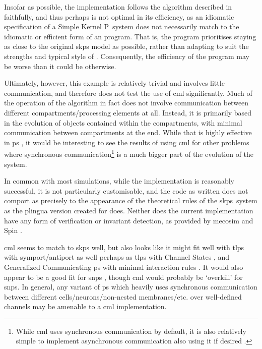 Insofar as possible, the implementation follows the algorithm described in \cite{Gheorghe2013} faithfully, and thus perhaps is not optimal in its efficiency, as an idiomatic specification of a Simple Kernel P~system does not necessarily match to the idiomatic or efficient form of an \fsharp{} program.  That is, the program prioritises staying as close to the original \gls{skps} model as possible, rather than adapting to suit the strengths and typical style of \fsharp{}.  Consequently, the efficiency of the program may be worse than it could be otherwise.

Ultimately, however, this example is relatively trivial and involves little communication, and therefore does not test the use of \gls{cml} significantly.  Much of the operation of the algorithm in fact does not involve communication between different compartments/processing elements at all.  Instead, it is primarily based in the evolution of objects contained within the compartments, with minimal communication between compartments at the end.  While that is highly effective in \gls{ps} \cite{Paun2008}, it would be interesting to see the results of using \gls{cml} for other problems where synchronous communication\footnote{While \gls{cml} uses synchronous communication by default, it is also relatively simple to implement asynchronous communication also using it if desired \cite{Reppy2007}.} is a much bigger part of the evolution of the system.

In common with most \adhoc{} simulations, while the implementation is reasonably successful, it is not particularly customisable, and the code as written does not comport as precisely to the appearance of the theoretical rules of the \gls{skps}~system as the \gls{plingua} version created for \cite{Gheorghe2013} does.  Neither does the current implementation have any form of verification or invariant detection, as provided by \gls{mecosim} \cite{Perez-Hurtado2010} and Spin \cite{Ben-Ari2008,Lefticaru2011}.

\gls{cml} seems to match to \gls{skps} well, but also looks like it might fit well with \gls{tlps} with symport/antiport \cite{Verlan2005} as well perhaps as \gls{tlps} with Channel States \cite{Song2016}, and Generalized Communicating \gls{ps} with minimal interaction rules \cite{Csuhaj-Varju2011}.  It would also appear to be a good fit for \gls{snps} \cite{Ionescu2006}, though \gls{cml} would probably be `overkill' for \gls{snps}.  In general, any variant of \gls{ps} which heavily uses synchronous communication between different cells/neurons/non-nested membranes/etc. over well-defined channels may be amenable to a \gls{cml} implementation.

